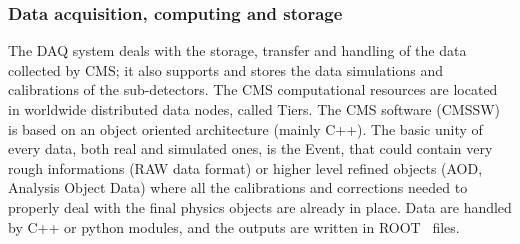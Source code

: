 \subsubsection{Data acquisition, computing and storage}
The DAQ system deals with the storage, transfer and handling of the data collected by CMS; it also supports and stores the data simulations and calibrations of the sub-detectors. The CMS computational resources are located in worldwide distributed data nodes, called Tiers. The CMS software (CMSSW) is based on an object oriented architecture (mainly C++). The basic unity of every data, both real and simulated ones, is the Event, that could contain very rough informations (RAW data format) or higher level refined objects (AOD, Analysis Object Data) where all the calibrations and corrections needed to properly deal with the final physics objects are already in place. Data are handled by C++ or python modules, and the outputs are written in ROOT~\cite{Brun:1997pa} files.

